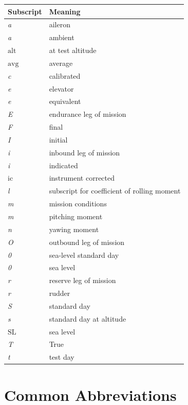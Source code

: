 \documentclass[
]{book}
\begin{document}
\begin{longtable}[]{@{}ll@{}}
\toprule
Subscript & Meaning\tabularnewline
\midrule
\endhead
\emph{a} & aileron\tabularnewline
\emph{a} & ambient\tabularnewline
\(\mathrm{alt}\) & at test altitude\tabularnewline
\(\mathrm{avg}\) & average\tabularnewline
\emph{c} & calibrated\tabularnewline
\emph{e} & elevator\tabularnewline
\emph{e} & equivalent\tabularnewline
\emph{E} & endurance leg of mission\tabularnewline
\emph{F} & final\tabularnewline
\emph{I} & initial\tabularnewline
\emph{i} & inbound leg of mission\tabularnewline
\emph{i} & indicated\tabularnewline
\(\mathrm{ic}\) & instrument corrected\tabularnewline
\emph{l} & subscript for coefficient of rolling moment\tabularnewline
\emph{m} & mission conditions\tabularnewline
\emph{m} & pitching moment\tabularnewline
\emph{n} & yawing moment\tabularnewline
\emph{O} & outbound leg of mission\tabularnewline
\emph{0} & sea-level standard day\tabularnewline
\emph{0} & sea level\tabularnewline
\emph{r} & reserve leg of mission\tabularnewline
\emph{r} & rudder\tabularnewline
\emph{S} & standard day\tabularnewline
\emph{s} & standard day at altitude\tabularnewline
\(\mathrm{SL}\) & sea level\tabularnewline
\emph{T} & True\tabularnewline
\emph{t} & test day\tabularnewline
\bottomrule
\end{longtable}

\hypertarget{common-abbreviations}{%
\section{Common Abbreviations}\label{common-abbreviations}}
\end{document}
